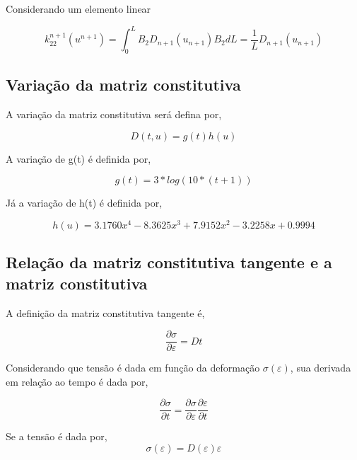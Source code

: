 \documentclass[12pt,a4paper]{article}
\newcommand{\diff}[1]{d#1}
\begin{document}
Considerando um elemento linear 

\begin{equation}
k^{n+1}_{22}(u^{n+1}) = \int_0^L B_2 D_{n+1}\left(u_{n+1}\right) B_2 \diff{L} = \frac{1}{L} D_{n+1}\left(u_{n+1}\right)
\end{equation}


\subsection{Variação da matriz constitutiva}

A variação da matriz constitutiva será defina por,

\begin{equation}
D(t,u) = g(t)h(u)
\end{equation}

A variação de g(t) é definida por,

\begin{equation}
g(t) = 3*log(10*(t+1))
\end{equation}

\noindent
Já a variação de h(t) é definida por,

\begin{equation}
h(u) = 3.1760x^4 - 8.3625x^3 + 7.9152x^2 - 3.2258x + 0.9994
\end{equation}

\subsection{Relação da matriz constitutiva tangente e a matriz constitutiva}

A definição da matriz constitutiva tangente é,

\begin{equation}
\frac{\partial \sigma}{\partial \varepsilon} = Dt
\end{equation}

Considerando que tensão é dada em função da deformação $\sigma(\varepsilon)$, sua derivada em relação ao tempo é dada por,

\begin{equation}
\frac{\partial \sigma}{\partial t} = \frac{\partial \sigma}{\partial \varepsilon} \frac{\partial \varepsilon}{\partial t}
\end{equation}

Se a tensão é dada por, 
\begin{equation}
\sigma(\varepsilon) = D(\varepsilon) \varepsilon
\end{equation}
\end{document}
